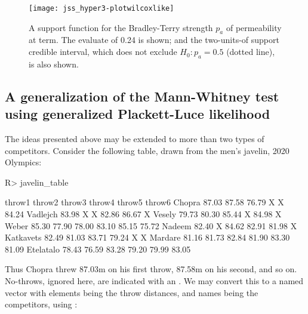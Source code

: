 \documentclass[article]{jss}
\begin{document}
\begin{figure}[htbp]
  \begin{center}
\texttt{[image: jss\_hyper3-plotwilcoxlike]}
\caption{A\label{wilcox_likelihood} support function for the Bradley-Terry
strength $p_a$ of permeability at term.  The evaluate of 0.24 is
shown; and the two-units-of support credible interval, which does not
exclude $H_0\colon p_a=0.5$ (dotted line), is also shown.}
\end{center}
\end{figure}

\subsection{A generalization of the Mann-Whitney test using
generalized Plackett-Luce likelihood}

The ideas presented above may be extended to more than two types of
competitors.  Consider the following table, drawn from the men's
javelin, 2020 Olympics:

\begin{Schunk}
\begin{Sinput}
R> javelin_table
\end{Sinput}
\begin{Soutput}
          throw1 throw2 throw3 throw4 throw5 throw6
Chopra     87.03  87.58  76.79      X      X  84.24
Vadlejch   83.98      X      X  82.86  86.67      X
Vesely     79.73  80.30  85.44      X  84.98      X
Weber      85.30  77.90  78.00  83.10  85.15  75.72
Nadeem     82.40      X  84.62  82.91  81.98      X
Katkavets  82.49  81.03  83.71  79.24      X      X
Mardare    81.16  81.73  82.84  81.90  83.30  81.09
Etelatalo  78.43  76.59  83.28  79.20  79.99  83.05
\end{Soutput}
\end{Schunk}

Thus Chopra threw 87.03m on his first throw, 87.58m on his second, and
so on.  No-throws, ignored here, are indicated with an .  We
may convert this to a named vector with elements being the throw
distances, and names being the competitors, using
:
\end{document}
